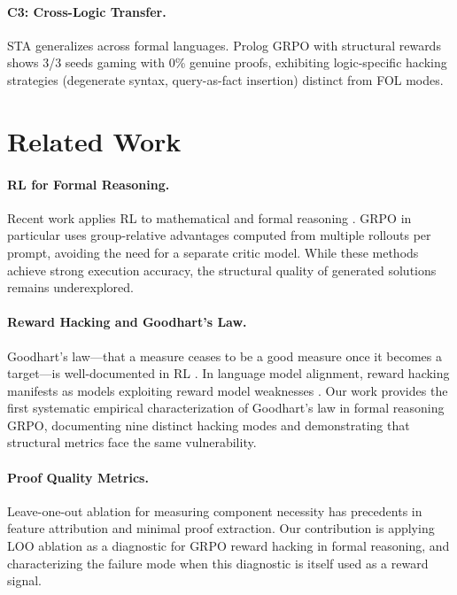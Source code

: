 \documentclass[11pt,a4paper]{article}
\newcommand{\sta}{\textsc{STA}}
\newcommand{\grpo}{\textsc{GRPO}}
\begin{document}
\paragraph{C3: Cross-Logic Transfer.}
\sta{} generalizes across formal languages.
Prolog \grpo{} with structural rewards shows 3/3 seeds gaming with 0\% genuine proofs, exhibiting logic-specific hacking strategies (degenerate syntax, query-as-fact insertion) distinct from FOL modes.

\section{Related Work}

\paragraph{RL for Formal Reasoning.}
Recent work applies RL to mathematical and formal reasoning \citep{shao2024deepseekmath, luo2024improve, wang2024math}.
\grpo{} in particular uses group-relative advantages computed from multiple rollouts per prompt, avoiding the need for a separate critic model.
While these methods achieve strong execution accuracy, the structural quality of generated solutions remains underexplored.

\paragraph{Reward Hacking and Goodhart's Law.}
Goodhart's law---that a measure ceases to be a good measure once it becomes a target---is well-documented in RL \citep{amodei2016concrete, pan2022effects, skalse2022defining}.
In language model alignment, reward hacking manifests as models exploiting reward model weaknesses \citep{gao2023scaling}.
Our work provides the first systematic empirical characterization of Goodhart's law in formal reasoning \grpo{}, documenting nine distinct hacking modes and demonstrating that structural metrics face the same vulnerability.

\paragraph{Proof Quality Metrics.}
Leave-one-out ablation for measuring component necessity has precedents in feature attribution \citep{covert2021explaining} and minimal proof extraction.
Our contribution is applying LOO ablation as a diagnostic for \grpo{} reward hacking in formal reasoning, and characterizing the failure mode when this diagnostic is itself used as a reward signal.
\end{document}
